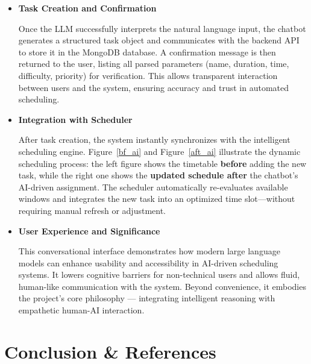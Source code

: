 \documentclass[12pt, a4paper]{article}
\begin{document}
\begin{enumerate}
\begin{itemize}
                        \item \textbf{Task Creation and Confirmation}  
                
                            Once the LLM successfully interprets the natural language input, the chatbot generates a structured task object and communicates with the backend API to store it in the MongoDB database. A confirmation message is then returned to the user, listing all parsed parameters (name, duration, time, difficulty, priority) for verification. This allows transparent interaction between users and the system, ensuring accuracy and trust in automated scheduling.
                        
                        \item \textbf{Integration with Scheduler}  
                        
                            After task creation, the system instantly synchronizes with the intelligent scheduling engine.  
                            Figure~\ref{bf_ai} and Figure~\ref{aft_ai} illustrate the dynamic scheduling process: the left figure shows the timetable \textbf{before} adding the new task, while the right one shows the \textbf{updated schedule after} the chatbot’s AI-driven assignment.  
                            The scheduler automatically re-evaluates available windows and integrates the new task into an optimized time slot—without requiring manual refresh or adjustment.
                        
                        \item \textbf{User Experience and Significance}  
                        
                            This conversational interface demonstrates how modern large language models can enhance usability and accessibility in AI-driven scheduling systems. It lowers cognitive barriers for non-technical users and allows fluid, human-like communication with the system. Beyond convenience, it embodies the project’s core philosophy — integrating intelligent reasoning with empathetic human-AI interaction.
                            
                    \end{itemize}
                
            \end{enumerate}



\section{Conclusion \& References}
\end{document}
